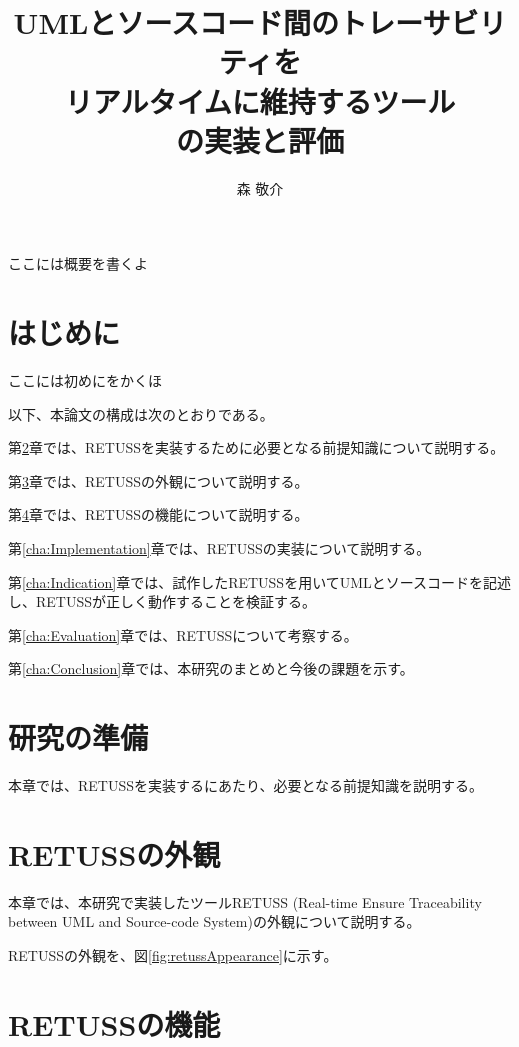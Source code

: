 \documentclass[uplatex, report, a4j, 10pt]{jsbook}
\title{UMLとソースコード間のトレーサビリティを \\ リアルタイムに維持するツール \\ \tool{}の実装と評価}
\author{森 敬介}
\newcommand{\tool}{RETUSS}
\newcommand{\toolFullName}{Real-time Ensure Traceability between UML and Source-code System}
\begin{document}
\maketitle


ここには概要を書くよ


%
\chapter{はじめに}\label{cha:Introduction}

ここには初めにをかくほ

以下、本論文の構成は次のとおりである。

第\ref{cha:Preparation}章では、\tool{}を実装するために必要となる前提知識について説明する。

第\ref{cha:Appearance}章では、\tool{}の外観について説明する。

第\ref{cha:Function}章では、\tool{}の機能について説明する。

第\ref{cha:Implementation}章では、\tool{}の実装について説明する。

第\ref{cha:Indication}章では、試作した\tool{}を用いてUMLとソースコードを記述し、\tool{}が正しく動作することを検証する。

第\ref{cha:Evaluation}章では、\tool{}について考察する。

第\ref{cha:Conclusion}章では、本研究のまとめと今後の課題を示す。



\chapter{研究の準備}\label{cha:Preparation}

本章では、\tool{}を実装するにあたり、必要となる前提知識を説明する。



\chapter{\tool{}の外観}\label{cha:Appearance}

本章では、本研究で実装したツール\tool{} (\toolFullName{})の外観について説明する。

\tool{}の外観を、図\ref{fig:retussAppearance}に示す。


\chapter{\tool{}の機能}\label{cha:Function}
\end{document}
